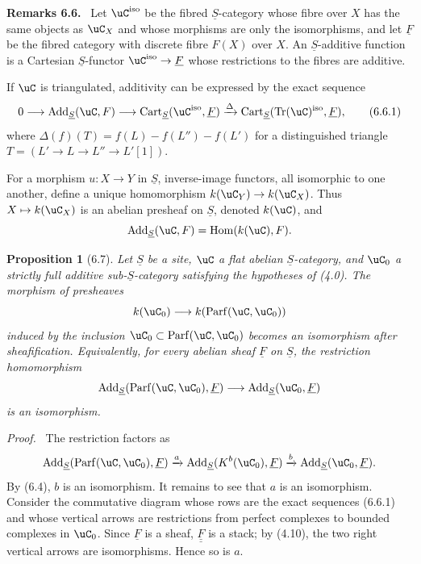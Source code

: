 \documentclass[11pt]{article}
\theoremstyle{plain}
\newtheorem*{proposition*}{Proposition}
\theoremstyle{definition}
\theoremstyle{remark}
\newenvironment{statement}[1]{\par\medskip\noindent\textbf{#1.}\ }{\par\medskip}
\newenvironment{prooftext}{\par\noindent\textit{Proof.}\ }{\par\medskip}
\DeclareMathOperator{\Hom}{Hom}
\DeclareMathOperator{\Tr}{Tr}
\providecommand{\Parf}{\operatorname{Parf}}
\providecommand{\uF}{\underline{F}}
\providecommand{\uS}{\underline{S}}
\providecommand{\Add}{\operatorname{Add}}
\providecommand{\Cart}{\operatorname{Cart}}
\begin{document}
\begin{statement}{Remarks 6.6}
Let $\uC^{\mathrm{iso}}$ be the fibred $\uS$-category whose fibre over $X$ has the same objects as $\uC_X$ and whose morphisms are only the isomorphisms, and let $\underline F$ be the fibred category with discrete fibre $F(X)$ over $X$. An $\uS$-additive function is a Cartesian $\uS$-functor $\uC^{\mathrm{iso}}\to\underline F$ whose restrictions to the fibres are additive.

If $\uC$ is triangulated, additivity can be expressed by the exact sequence
\[
0\longrightarrow\Add_{\uS}(\uC,F)
\longrightarrow\Cart_{\uS}(\uC^{\mathrm{iso}},\underline F)
\xrightarrow{\Delta}
\Cart_{\uS}(\Tr(\uC)^{\mathrm{iso}},\underline F),
\tag{6.6.1}
\]
where $\Delta(f)(T)=f(L)-f(L'')-f(L')$ for a distinguished triangle $T=(L'\to L\to L''\to L'[1])$.

For a morphism $u:X\to Y$ in $\uS$, inverse-image functors, all isomorphic to one another, define a unique homomorphism $k(\uC_Y)\to k(\uC_X)$. Thus $X\mapsto k(\uC_X)$ is an abelian presheaf on $\uS$, denoted $k(\uC)$, and
\[
\Add_{\uS}(\uC,F)=\Hom(k(\uC),F).
\]
\end{statement}

\begin{proposition*}[6.7]
Let $\uS$ be a site, $\uC$ a flat abelian $\uS$-category, and $\uC_0$ a strictly full additive sub-$\uS$-category satisfying the hypotheses of (4.0). The morphism of presheaves
\[
k(\uC_0)\longrightarrow k(\Parf(\uC,\uC_0))
\]
induced by the inclusion $\uC_0\subset\Parf(\uC,\uC_0)$ becomes an isomorphism after sheafification. Equivalently, for every abelian sheaf $\uF$ on $\uS$, the restriction homomorphism
\[
\Add_{\uS}(\Parf(\uC,\uC_0),\uF)
\longrightarrow
\Add_{\uS}(\uC_0,\uF)
\]
is an isomorphism.
\end{proposition*}

\begin{prooftext}
The restriction factors as
\[
\Add_{\uS}(\Parf(\uC,\uC_0),\uF)
\xrightarrow{a}
\Add_{\uS}(K^b(\uC_0),\uF)
\xrightarrow{b}
\Add_{\uS}(\uC_0,\uF).
\]
By (6.4), $b$ is an isomorphism. It remains to see that $a$ is an isomorphism. Consider the commutative diagram whose rows are the exact sequences (6.6.1) and whose vertical arrows are restrictions from perfect complexes to bounded complexes in $\uC_0$. Since $\uF$ is a sheaf, $\underline{\uF}$ is a stack; by (4.10), the two right vertical arrows are isomorphisms. Hence so is $a$.
\end{prooftext}
\end{document}
